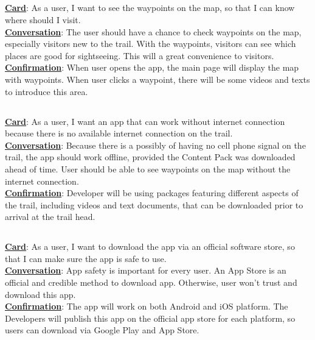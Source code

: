 \documentclass[letterpaper, 10pt,titlepage]{article}
\begin{document}
\subsection{ }
\textbf{\underline{Card}}: As a user, I want to see the waypoints on the map, so that I can know where should I visit.\\ 
\textbf{\underline{Conversation}}: The user should have a chance to check waypoints on the map, especially visitors new to the trail. With the waypoints, visitors can see which places are good for sightseeing. This will a great convenience to visitors.\\
\textbf{\underline{Confirmation}}: When user opens the app, the main page will display the map with waypoints. When user clicks a waypoint, there will be some videos and texts to introduce this area.

\subsection{ }
\textbf{\underline{Card}}: As a user, I want an app that can work without internet connection because there is no available internet connection on the trail.\\
\textbf{\underline{Conversation}}: Because there is a possibly of having no cell phone signal on the trail, the app should work offline, provided the Content Pack was downloaded ahead of time. User should be able to see waypoints on the map without the internet connection.\\
\textbf{\underline{Confirmation}}: Developer will be using packages featuring different aspects of the trail, including videos and text documents, that can be downloaded prior to arrival at the trail head.
\subsection{ }
\textbf{\underline{Card}}: As a user, I want to download the app via an official software store, so that I can make sure the app is safe to use.\\
\textbf{\underline{Conversation}}: App safety is important for every user. An App Store is an official and credible method to download app. Otherwise, user won’t trust and download this app.\\
\textbf{\underline{Confirmation}}: The app will work on both Android and iOS platform. The Developers will publish this app on the official app store for each platform, so users can download via Google Play and App Store.
\end{document}

